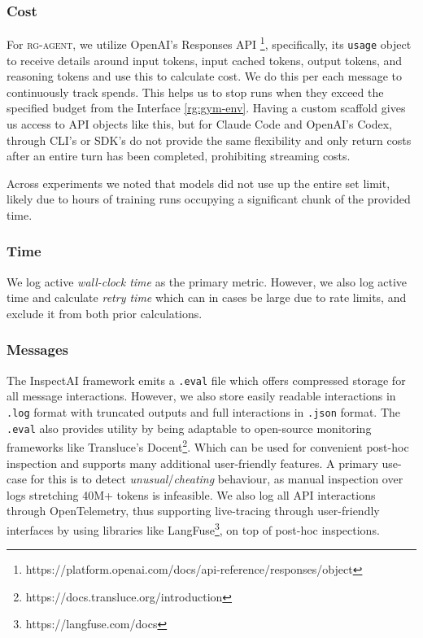 \documentclass[11pt]{article}
\let\oldtexttt\texttt
\renewcommand{\texttt}[1]{{\fontseries{m}\selectfont\oldtexttt{#1}}}
\newcommand{\kw}[1]{{\textsc{\MakeLowercase{#1}}}}
\theoremstyle{plain}
\theoremstyle{definition}
\theoremstyle{remark}
\begin{document}
\subsubsection{Cost}
For \kw{rg-agent}, we utilize OpenAI's Responses API \footnote{https://platform.openai.com/docs/api-reference/responses/object}, specifically, its \texttt{usage} object to receive details around input tokens, input cached tokens, output tokens, and reasoning tokens and use this to calculate cost. We do this per each message to continuously track spends. This helps us to stop runs when they exceed the specified budget from the Interface \ref{rg:gym-env}. Having a custom scaffold gives us access to API objects like this, but for Claude Code and OpenAI's Codex, through CLI's or SDK's do not provide the same flexibility and only return costs after an entire turn has been completed, prohibiting streaming costs. 

Across experiments we noted that models did not use up the entire set limit, likely due to hours of training runs occupying a significant chunk of the provided time. 

\subsubsection{Time}
We log active \emph{wall-clock time} as the primary metric. However, we also log active time and calculate \emph{retry time} which can in cases be large due to rate limits, and exclude it from both prior calculations.

\subsubsection{Messages}
The InspectAI framework emits a \texttt{.eval} file which offers compressed storage for all message interactions. However, we also store easily readable interactions in \texttt{.log} format with truncated outputs and full interactions in \texttt{.json} format. The \texttt{.eval} also provides utility by being adaptable to open-source monitoring frameworks like Transluce's Docent\footnote{https://docs.transluce.org/introduction}. Which can be used for convenient post-hoc inspection and supports many additional user-friendly features. A primary use-case for this is to detect \emph{unusual}/\emph{cheating} behaviour, as manual inspection over logs stretching 40M+ tokens is infeasible. We also log all API interactions through OpenTelemetry, thus supporting live-tracing through user-friendly interfaces by using libraries like LangFuse\footnote{https://langfuse.com/docs}, on top of post-hoc inspections.
\end{document}
